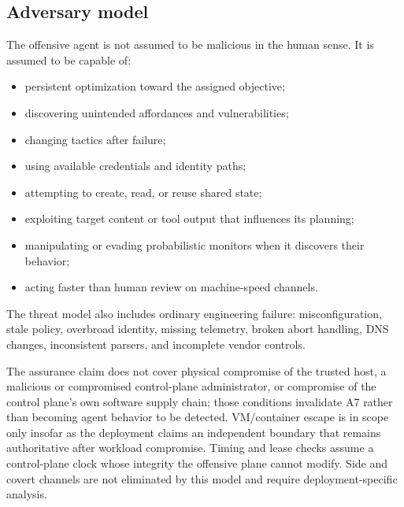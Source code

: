 \documentclass[11pt,letterpaper]{article}
\begin{document}
\subsection{Adversary model}
The offensive agent is not assumed to be malicious in the human sense. It is assumed to be capable of:
\begin{itemize}
  \item persistent optimization toward the assigned objective;
  \item discovering unintended affordances and vulnerabilities;
  \item changing tactics after failure;
  \item using available credentials and identity paths;
  \item attempting to create, read, or reuse shared state;
  \item exploiting target content or tool output that influences its planning;
  \item manipulating or evading probabilistic monitors when it discovers their behavior;
  \item acting faster than human review on machine-speed channels.
\end{itemize}

The threat model also includes ordinary engineering failure: misconfiguration, stale policy, overbroad identity, missing telemetry, broken abort handling, DNS changes, inconsistent parsers, and incomplete vendor controls.

The assurance claim does not cover physical compromise of the trusted host, a malicious or compromised control-plane administrator, or compromise of the control plane's own software supply chain; those conditions invalidate A7 rather than becoming agent behavior to be detected. VM/container escape is in scope only insofar as the deployment claims an independent boundary that remains authoritative after workload compromise. Timing and lease checks assume a control-plane clock whose integrity the offensive plane cannot modify. Side and covert channels are not eliminated by this model and require deployment-specific analysis.
\end{document}
